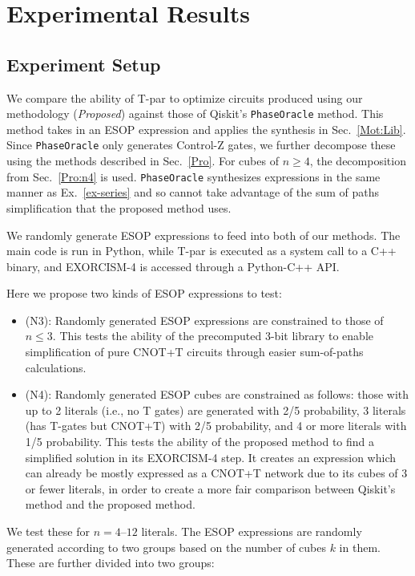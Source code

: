 \section{Experimental Results}
\label{Exp}
\subsection{Experiment Setup}
\label{Exp:Set}
We compare the ability of T-par to optimize circuits produced using our methodology ({\it Proposed}) against those
of Qiskit's \texttt{PhaseOracle} method. This method takes in an ESOP expression and applies the synthesis in
Sec.~\ref{Mot:Lib}. Since \texttt{PhaseOracle} only generates Control-Z gates,
we further decompose these using the methods described in Sec.~\ref{Pro}.  For cubes of $n \geq 4$,
the decomposition from Sec.~\ref{Pro:n4} is used. \texttt{PhaseOracle} synthesizes expressions in the same
manner as Ex.~\ref{ex-series} and so cannot take advantage of the sum of paths simplification that
the proposed method uses.

We randomly generate ESOP expressions to feed into both of our methods. The main code is run in Python, while T-par is executed as a system call to a C++ binary, and EXORCISM-4 is accessed through a Python-C++ API.

Here we propose two kinds of ESOP expressions to test:

\begin{itemize}
\item (N3): Randomly generated ESOP expressions are constrained to those of $n \leq 3$. This tests the ability of the precomputed 3-bit library to enable simplification of pure CNOT+T circuits through easier sum-of-paths calculations.
\item (N4): Randomly generated ESOP cubes are constrained as follows: those with up to 2 literals (i.e., no T gates) are generated with 2/5 probability, 3 literals (has T-gates but CNOT+T) with 2/5 probability, and 4 or more literals with 1/5 probability. This tests the ability of the proposed method to find a simplified solution in its EXORCISM-4 step. It creates an expression which can already be mostly expressed as a CNOT+T network due to its cubes of 3 or fewer literals, in order to create a more fair comparison between Qiskit's method and the proposed method.
\end{itemize}

We test these for $n=4$--$12$ literals. The ESOP expressions are randomly generated according to two groups based on the number of cubes $k$ in them. These are further divided into two groups:

